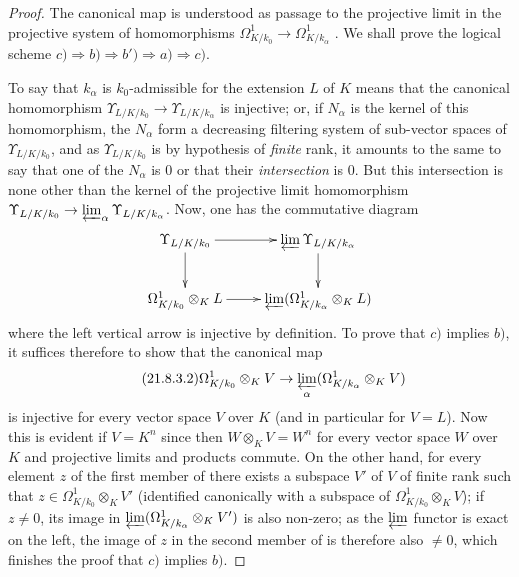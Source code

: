 \begin{proof}
The canonical map  is understood as passage to the projective limit in the projective system of homomorphisms $\Omega^1_{K/k_0}\to\Omega^1_{K/k_\alpha}$ .
We shall prove the logical scheme $c)\Rightarrow b)\Rightarrow b')\Rightarrow a)\Rightarrow c)$.

To say that $k_\alpha$ is $k_0$-admissible for the extension $L$ of $K$ means that the canonical homomorphism $\Upsilon_{L/K/k_0}\to\Upsilon_{L/K/k_\alpha}$ is injective; or, if $N_\alpha$ is the kernel of this homomorphism, the $N_\alpha$ form a decreasing filtering system of sub-vector spaces of $\Upsilon_{L/K/k_0}$, and as $\Upsilon_{L/K/k_0}$ is by hypothesis of \emph{finite} rank, it amounts to the same to say that one of the $N_\alpha$ is $0$ or that their \emph{intersection} is $0$.
But this intersection is none other than the kernel of the projective limit homomorphism $\Upsilon_{L/K/k_0}\to\varprojlim_\alpha\Upsilon_{L/K/k_\alpha}$.
Now, one has the commutative diagram
\[
  \xymatrix{
    \Upsilon_{L/K/k_0}\ar[r]\ar[d] & \varprojlim\Upsilon_{L/K/k_\alpha}\ar[d]\\
    \Omega^1_{K/k_0}\otimes_K L\ar[r] & \varprojlim(\Omega^1_{K/k_\alpha}\otimes_K L)
  }
\]
where the left vertical arrow is injective by definition.
To prove that $c)$ implies $b)$, it suffices therefore to show that the canonical map
\begin{equation}
\tag{21.8.3.2}
  \label{0.21.8.3.2}
  \Omega^1_{K/k_0}\otimes_K V\to\varprojlim_\alpha(\Omega^1_{K/k_\alpha}\otimes_K V)
\end{equation}
is injective for every vector space $V$ over $K$ (and in particular for $V=L$).
Now this is evident if $V=K^n$ since then $W\otimes_K V=W^n$ for every vector space $W$ over $K$ and projective limits and products commute.
On the other hand, for every element $z$ of the first member of  there exists a subspace $V'$ of $V$ of finite rank such that $z\in\Omega^1_{K/k_0}\otimes_K V'$ (identified canonically with a subspace of $\Omega^1_{K/k_0}\otimes_K V$); if $z\neq 0$, its image in $\varprojlim(\Omega^1_{K/k_\alpha}\otimes_K V')$ is also non-zero; as the $\varprojlim$ functor is exact on the left, the image of $z$ in the second member of  is therefore also $\neq 0$, which finishes the proof that $c)$ implies $b)$.


\end{proof}
